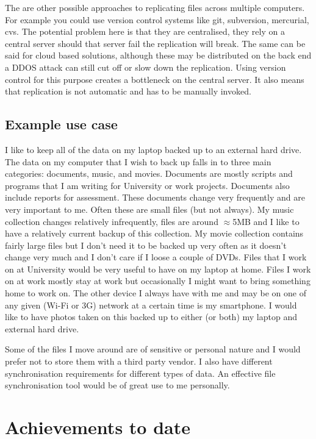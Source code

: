 \documentclass[12pt]{article}
\begin{document}
The are other possible approaches to replicating files
across multiple computers. For example you could use
version control systems like git, subversion, mercurial,
cvs. The potential problem here is that they are
centralised, they rely on a central server should that
server fail the replication will break. The same
can be said for cloud based solutions, although
these may be distributed on the back end a DDOS attack
can still cut off or slow down the replication.
Using version control for this purpose creates
a bottleneck on the central server. It also
means that replication is not automatic and has
to be manually invoked.



\subsection*{Example use case}

I like to keep all of the data on my laptop backed up to an
external hard drive. The data on my computer that I wish
to back up falls in to three main categories: documents, music, and movies.
Documents are mostly scripts and programs that I am writing for
University or work projects. Documents also include reports for
assessment. These documents change very frequently and are very important
to me. Often these are small files (but not always). My music collection
changes relatively infrequently, files are around $\approx$5MB and I like to
have a relatively current backup of this collection. My movie collection
contains fairly large files but I don't need it to be backed up very often
as it doesn't change very much and I don't care if I loose a couple of
DVDs. Files that I work on at University would be very useful to have
on my laptop at home. Files I work on at work mostly stay at work
but occasionally I might want to bring something home to work on.
The other device I always have with me and may be on one of any given
(Wi-Fi or 3G) network at a certain time is my smartphone. I would like
to have photos taken on this backed up to either (or both) my laptop and
external hard drive. 

Some of the files I move around are of sensitive or personal nature
and I would prefer not to store them with a third party vendor.
I also have different synchronisation requirements for different
types of data. An effective file synchronisation tool would be of
great use to me personally.

\section{Achievements to date}
\end{document}
